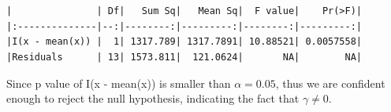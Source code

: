 \documentclass[11pt]{article}
\begin{document}
    
    \begin{verbatim}


|               | Df|   Sum Sq|   Mean Sq|  F value|    Pr(>F)|
|:--------------|--:|--------:|---------:|--------:|---------:|
|I(x - mean(x)) |  1| 1317.789| 1317.7891| 10.88521| 0.0057558|
|Residuals      | 13| 1573.811|  121.0624|       NA|        NA|
    \end{verbatim}

    
    Since p value of I(x - mean(x)) is smaller than \(\alpha=0.05\), thus we
are confident enough to reject the null hypothesis, indicating the fact
that \(\gamma \neq 0\).


    
    
    
    
\end{document}
